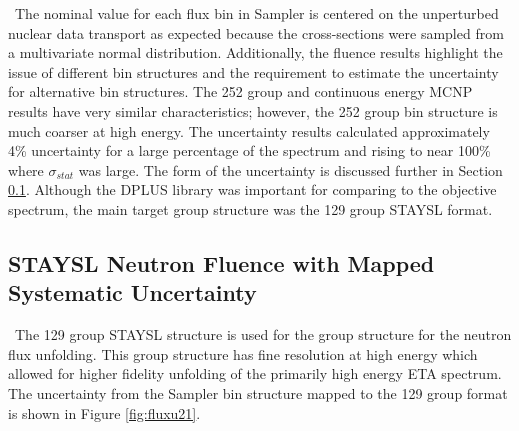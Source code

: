 \ The nominal value for each flux bin in Sampler is centered on the unperturbed nuclear data transport as expected because the cross-sections were sampled from a multivariate normal distribution.
Additionally, the fluence results highlight the issue of different bin structures and the requirement to estimate the uncertainty for alternative bin structures. 
The 252 group and continuous energy MCNP results have very similar characteristics; however, the 252 group bin structure is much coarser at high energy.  
The uncertainty results calculated approximately 4\% uncertainty for a large percentage of the spectrum and rising to near 100\% where $\sigma_{stat}$ was large. 
The form of the uncertainty is discussed further in Section \ref{UncertDiscuss}.
Although the DPLUS library was important for comparing to the objective spectrum, the main target group structure was the 129 group STAYSL format. 

\subsection{STAYSL Neutron Fluence with Mapped Systematic Uncertainty}\label{UncertDiscuss}

\ The 129 group STAYSL structure is used for the group structure for the neutron flux unfolding. 
This group structure has fine resolution at high energy which allowed for higher fidelity unfolding of the primarily high energy ETA spectrum. 
The uncertainty from the Sampler bin structure mapped to the 129 group format is shown in Figure \ref{fig:fluxu21}.

